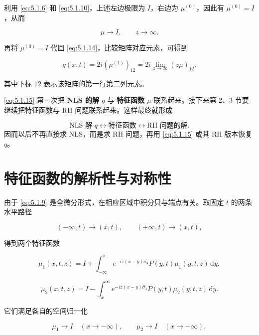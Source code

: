 \documentclass[
    lang=cn,
    scheme=chinese,
    mode=simple,
    device=normal,
    color=blue,
    math=cm,
    thmcnt=section,
    12pt,
    nowatermark
]{elegantbook}
\begin{document}
利用 \eqref{eq:5.1.6} 和 \eqref{eq:5.1.10}，上述左边极限为 $I$，右边为 $\mu^{(0)}$，因此有 $\mu^{(0)}=I$，从而

\[
    \mu\to I,\qquad z\to\infty.
\]

再将 $\mu^{(0)}=I$ 代回 \eqref{eq:5.1.14}，比较矩阵对应元素，可得到

\begin{equation}
    q(x,t)
    =
    2i(\mu^{(1)})_{12}
    =
    2i\lim\limits_{z\to\infty}(z\mu)_{12}.
    \tag{5.1.15}
    \label{eq:5.1.15}
\end{equation}

其中下标 $12$ 表示该矩阵的第一行第二列元素。

\begin{callout}
    \eqref{eq:5.1.15} 第一次把 \textbf{NLS 的解 $q$} 与 \textbf{特征函数 $\mu$} 联系起来。接下来第 2、3 节要继续把特征函数与 RH 问题联系起来。这样最终就形成

    \[
        \text{NLS 解 }q
        \longleftrightarrow
        \text{特征函数}
        \longleftrightarrow
        \text{RH 问题的解}.
    \]
    因而以后不再直接求 NLS，而是求 RH 问题，再用 \eqref{eq:5.1.15} 或其 RH 版本恢复 $q$。
\end{callout}

\section{特征函数的解析性与对称性}

由于 \eqref{eq:5.1.9} 是全微分形式，在相应区域中积分只与端点有关。取固定 $t$ 的两条水平路径

\[
    (-\infty,t)\to(x,t),
    \qquad
    (+\infty,t)\to(x,t),
\]

得到两个特征函数

\begin{equation}
    \mu_1(x,t,z)
    =
    I+
    \int_{-\infty}^{x}
    e^{-iz(x-y)\widehat{\sigma}_3}
    P(y,t)\mu_1(y,t,z)\,\mathrm dy,
    \tag{5.2.1}
    \label{eq:5.2.1}
\end{equation}

\begin{equation}
    \mu_2(x,t,z)
    =
    I-
    \int_x^{\infty}
    e^{-iz(x-y)\widehat{\sigma}_3}
    P(y,t)\mu_2(y,t,z)\,\mathrm dy.
    \tag{5.2.2}
    \label{eq:5.2.2}
\end{equation}

它们满足各自的空间归一化

\[
    \mu_1\to I\quad(x\to-\infty),
    \qquad
    \mu_2\to I\quad(x\to+\infty),
\]
\end{document}
